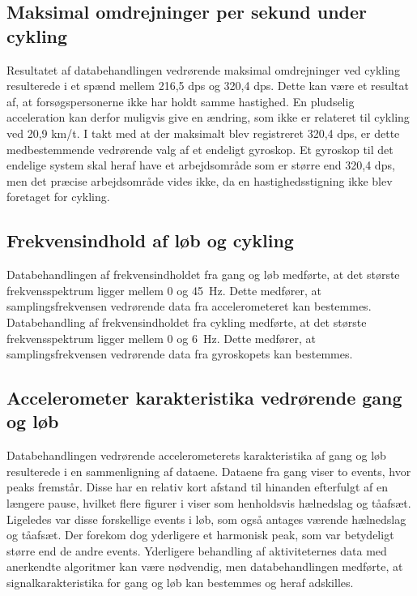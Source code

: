 \subsection{Maksimal omdrejninger per sekund under cykling}
Resultatet af databehandlingen vedrørende maksimal omdrejninger ved cykling resulterede i et spænd mellem 216,5 dps og 320,4 dps. Dette kan være et resultat af, at forsøgspersonerne ikke har holdt samme hastighed. En pludselig acceleration kan derfor muligvis give en ændring, som ikke er relateret til cykling ved 20,9 km/t. I takt med at der maksimalt blev registreret 320,4 dps, er dette medbestemmende vedrørende valg af et endeligt gyroskop. Et gyroskop til det endelige system skal heraf have et arbejdsområde som er større end 320,4 dps, men det præcise arbejdsområde vides ikke, da en hastighedsstigning ikke blev foretaget for cykling.

\subsection{Frekvensindhold af løb og cykling}
Databehandlingen af frekvensindholdet fra gang og løb medførte, at det største frekvensspektrum ligger mellem 0 og 45~Hz. Dette medfører, at samplingsfrekvensen vedrørende data fra accelerometeret kan bestemmes. \\
Databehandling af frekvensindholdet fra cykling medførte, at det største frekvensspektrum ligger mellem 0 og 6~Hz. Dette medfører, at samplingsfrekvensen vedrørende data fra gyroskopets kan bestemmes. 

\subsection{Accelerometer karakteristika vedrørende gang og løb}
Databehandlingen vedrørende accelerometerets karakteristika af gang og løb resulterede i en sammenligning af dataene. Dataene fra gang viser to events, hvor peaks fremstår. Disse har en relativ kort afstand til hinanden efterfulgt af en længere pause, hvilket flere figurer i  viser som henholdsvis hælnedslag og tåafsæt. Ligeledes var disse forskellige events i løb, som også antages værende hælnedslag og tåafsæt. Der forekom dog yderligere et harmonisk peak, som var betydeligt større end de andre events. Yderligere behandling af aktiviteternes data med anerkendte algoritmer kan være nødvendig, men databehandlingen medførte, at signalkarakteristika for gang og løb kan bestemmes og heraf adskilles.

